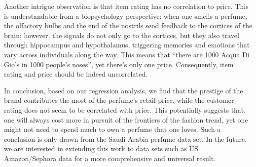\documentclass[12pt]{amsart}
\begin{document}
Another intrigue observation is that item rating has no correlation to price. This is 
understandable from a biopsychology perspective: when one smells a perfume, the olfactory 
bulbs and the end of the nostrils send feedback to the cortices of the brain; however, the signals 
do not only go to the cortices, but they also travel through hippocampus and hypothalamus, 
triggering memories and emotions that vary across individuals along the way. This means that 
“there are 1000 Acqua Di Gio’s in 1000 people’s noses”, yet there’s only one price. 
Consequently, item rating and price should be indeed uncorrelated.

In conclusion, based on our regression analysis, we find that the prestige of the brand contributes the most of the perfume's retail price, while the customer rating does not seem to be correlated with price. This potentially suggests that, one will always cost more in pursuit of the frontiers of the fashion trend, yet one might not need to spend much to own a perfume that one loves. Such a conclusion is only drawn from the Saudi Arabia perfume data set. In the future, we are interested in extending this work to data sets such as US Amazon/Sephora data for a more comprehensive and universal result.
 
 
\end{document}
